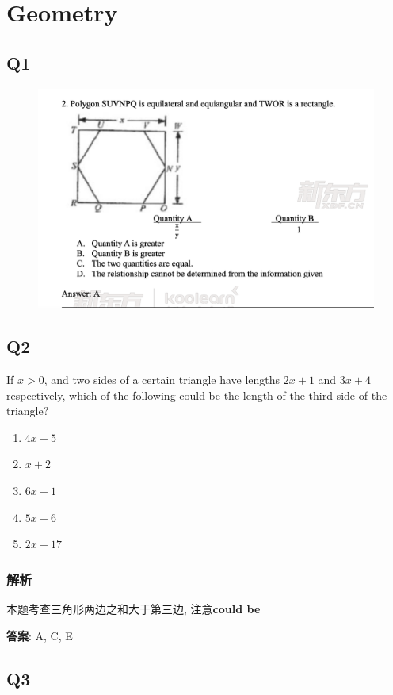 \chapter{Geometry}

\section{Q1}

  \begin{figure}[H]
    \centering
    \includegraphics[width=0.7\columnwidth]{images/areas/geometry/q1}
  \end{figure}

\section{Q2}

  If $ x > 0 $, and two sides of a certain triangle have lengths $ 2 x + 1 $
  and $ 3 x + 4 $ respectively, which of the following could be the length of
  the third side of the triangle?

  \begin{enumerate}
    \item $ 4x + 5 $
    \item $ x + 2 $
    \item $ 6x + 1 $
    \item $ 5x + 6 $
    \item $ 2x + 17 $
  \end{enumerate}

  \subsection{解析}

    本题考查三角形两边之和大于第三边, 注意\textbf{could be}

    \textbf{答案}: A, C, E

\section{Q3}

